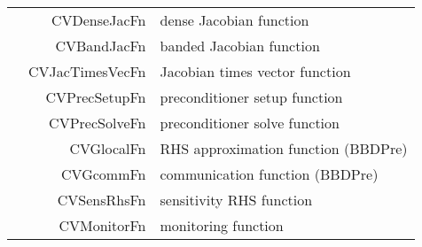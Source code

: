 \begin{table}[h]
\begin{tabular}{|c||r|l|}
  &  CVDenseJacFn    &  dense Jacobian function \\
  &  CVBandJacFn     &  banded Jacobian function \\
  &  CVJacTimesVecFn &  Jacobian times vector function \\
  &  CVPrecSetupFn   &  preconditioner setup function \\
  &  CVPrecSolveFn   &  preconditioner solve function \\
  &  CVGlocalFn      &  RHS approximation function (BBDPre) \\
  &  CVGcommFn       &  communication function (BBDPre) \\
  &  CVSensRhsFn     &  sensitivity RHS function \\
  &  CVMonitorFn     &  monitoring function \\
 \hline
\end{tabular}
\end{table}
